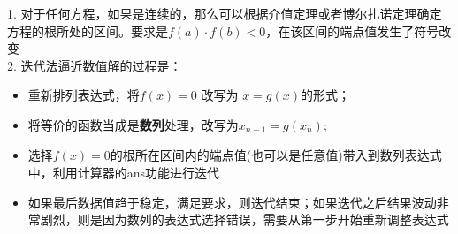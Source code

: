 \begin{SummBox}
1. 对于任何方程，如果是连续的，那么可以根据介值定理或者博尔扎诺定理确定方程的根所处的区间。要求是$f(a)\cdot f(b)<0$，在该区间的端点值发生了符号改变\\

2. 迭代法逼近数值解的过程是：
\begin{itemize}
	\item 重新排列表达式，将$f(x)=0$ 改写为 $x=g(x)$的形式；
	\item 将等价的函数当成是\textbf{数列}处理，改写为$x_{n+1}=g(x_n)$;
	\item 选择$f(x)=0$的根所在区间内的端点值(也可以是任意值)带入到数列表达式中，利用计算器的ans功能进行迭代
	\item 如果最后数据值趋于稳定，满足要求，则迭代结束；如果迭代之后结果波动非常剧烈，则是因为数列的表达式选择错误，需要从第一步开始重新调整表达式
\end{itemize}

\end{SummBox}




